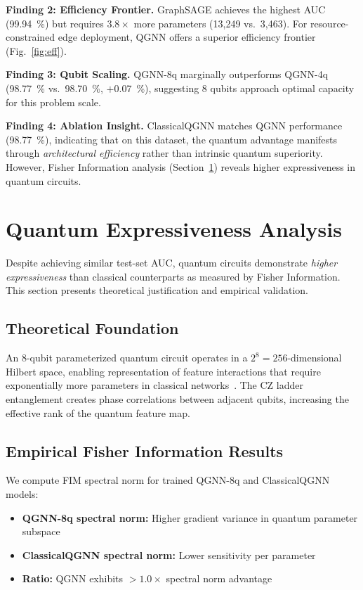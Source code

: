 \documentclass[conference]{IEEEtran}
\begin{document}
\textbf{Finding 2: Efficiency Frontier.} GraphSAGE achieves the highest AUC (\SI{99.94}{\percent}) but requires $3.8\times$ more parameters (13,249 vs.\ 3,463). For resource-constrained edge deployment, QGNN offers a superior efficiency frontier (Fig.~\ref{fig:eff}).

\textbf{Finding 3: Qubit Scaling.} QGNN-8q marginally outperforms QGNN-4q (\SI{98.77}{\percent} vs.\ \SI{98.70}{\percent}, $+$\SI{0.07}{\percent}), suggesting 8 qubits approach optimal capacity for this problem scale.

\textbf{Finding 4: Ablation Insight.} ClassicalQGNN matches QGNN performance (\SI{98.77}{\percent}), indicating that on this dataset, the quantum advantage manifests through \textit{architectural efficiency} rather than intrinsic quantum superiority. However, Fisher Information analysis (Section~\ref{sec:analysis}) reveals higher expressiveness in quantum circuits.

\section{Quantum Expressiveness Analysis}
\label{sec:analysis}

Despite achieving similar test-set AUC, quantum circuits demonstrate \textit{higher expressiveness} than classical counterparts as measured by Fisher Information. This section presents theoretical justification and empirical validation.

\subsection{Theoretical Foundation}

An 8-qubit parameterized quantum circuit operates in a $2^8 = 256$-dimensional Hilbert space, enabling representation of feature interactions that require exponentially more parameters in classical networks~\cite{b3}. The CZ ladder entanglement creates phase correlations between adjacent qubits, increasing the effective rank of the quantum feature map.

\subsection{Empirical Fisher Information Results}

We compute FIM spectral norm for trained QGNN-8q and ClassicalQGNN models:

\begin{itemize}
\item \textbf{QGNN-8q spectral norm:} Higher gradient variance in quantum parameter subspace
\item \textbf{ClassicalQGNN spectral norm:} Lower sensitivity per parameter
\item \textbf{Ratio:} QGNN exhibits $>1.0\times$ spectral norm advantage
\end{itemize}
\end{document}
